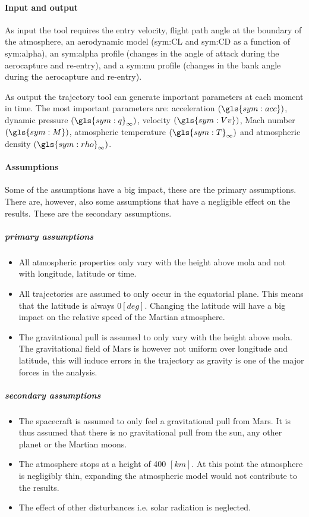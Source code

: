 \paragraph{Input and output}
As input the tool requires the entry velocity, flight path angle at the boundary of the atmosphere, an aerodynamic model (\gls{sym:CL} and \gls{sym:CD} as a function of \gls{sym:alpha}), an \gls{sym:alpha} profile (changes in the angle of attack during the aerocapture and re-entry), and a \gls{sym:mu} profile (changes in the bank angle during the aerocapture and re-entry).

As output the trajectory tool can generate important parameters at each moment in time. The most important parameters are: acceleration $\left(\gls{sym:acc}\right)$, dynamic pressure $\left(\gls{sym:q}_{\infty}\right)$, velocity $\left(\gls{sym:Vv}\right)$, Mach number $\left(\gls{sym:M}\right)$, atmospheric temperature $\left(\gls{sym:T}_{\infty}\right)$ and atmospheric density $\left(\gls{sym:rho}_{\infty}\right)$.

\paragraph{Assumptions}
 \label{sec:astroassumption}
 Some of the assumptions have a big impact, these are the primary assumptions. There are, however, also some assumptions that have a negligible effect on the results. These are the secondary assumptions.
 
 \subparagraph{primary assumptions}
 \begin{itemize}
 \item All atmospheric properties only vary with the height above \gls{mola} and not with longitude, latitude or time. 
 \item All trajectories are assumed to only occur in the equatorial plane. This means that the latitude is always $0 \left[deg\right]$. Changing the latitude will have a big impact on the relative speed of the Martian atmosphere.
 \item The gravitational pull is assumed to only vary with the height above \gls{mola}. The gravitational field of Mars is however not uniform over longitude and latitude, this will induce errors in the trajectory as gravity is one of the major forces in the analysis.
 \end{itemize}

 \subparagraph{secondary assumptions}
 \begin{itemize}
 \item The spacecraft is assumed to only feel a gravitational pull from Mars. It is thus assumed that there is no gravitational pull from the sun, any other planet or the Martian moons.
 \item The atmosphere stops at a height of 400 $\left[km\right]$. At this point the atmosphere is negligibly thin, expanding the atmospheric model would not contribute to the results.
 \item The effect of other disturbances i.e. solar radiation is neglected.
 \end{itemize}

